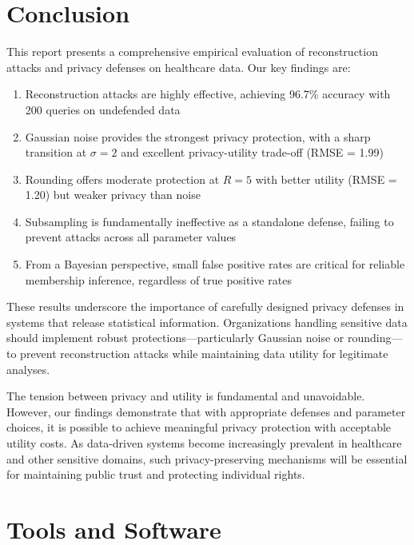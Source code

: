 \documentclass[11pt,letterpaper]{article}
\begin{document}
\section{Conclusion}

This report presents a comprehensive empirical evaluation of reconstruction attacks and privacy defenses on healthcare data. Our key findings are:

\begin{enumerate}[leftmargin=*]
    \item Reconstruction attacks are highly effective, achieving 96.7\% accuracy with 200 queries on undefended data
    
    \item Gaussian noise provides the strongest privacy protection, with a sharp transition at $\sigma = 2$ and excellent privacy-utility trade-off (RMSE = 1.99)
    
    \item Rounding offers moderate protection at $R = 5$ with better utility (RMSE = 1.20) but weaker privacy than noise
    
    \item Subsampling is fundamentally ineffective as a standalone defense, failing to prevent attacks across all parameter values
    
    \item From a Bayesian perspective, small false positive rates are critical for reliable membership inference, regardless of true positive rates
\end{enumerate}

These results underscore the importance of carefully designed privacy defenses in systems that release statistical information. Organizations handling sensitive data should implement robust protections---particularly Gaussian noise or rounding---to prevent reconstruction attacks while maintaining data utility for legitimate analyses.

The tension between privacy and utility is fundamental and unavoidable. However, our findings demonstrate that with appropriate defenses and parameter choices, it is possible to achieve meaningful privacy protection with acceptable utility costs. As data-driven systems become increasingly prevalent in healthcare and other sensitive domains, such privacy-preserving mechanisms will be essential for maintaining public trust and protecting individual rights.

\section*{Tools and Software}
\end{document}
